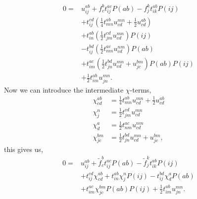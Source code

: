 \documentclass[
    a4paper, aps, twocolumn, floatfix, superscriptaddress,
    nofootinbib]{revtex4-1}
\newcommand{\1}{\mathds{1}}
\begin{document}
    \begin{equation}
        \begin{aligned}
        0 =& u^{ab}_{ij} + f^b_c t^{ac}_{ij}P(ab) - f^k_jt^{ab}_{ik}P(ij) \\
          &+ t^{cd}_{ij} \left(\frac{1}{4}t^{ab}_{mn} u^{mn}_{cd} + \frac{1}{2} u^{ab}_{cd} \right) \\
          &+  t^{ab}_{in} \left(\frac{1}{2} t^{cd}_{jm} u^{mn}_{cd}\right) P(ij) \\
          &- t^{bd}_{ij} \left(\frac{1}{2}t^{ac}_{nm}  u^{nm}_{cd}\right) P(ab) \\
          &+ t^{ac}_{im}\left(\frac{1}{2} t^{bd}_{jn} u^{mn}_{cd} + u^{bm}_{jc} \right)P(ab) P(ij) \\
          &+ \frac{1}{2}t^{ab}_{im} u^{mn}_{jn}.
        \end{aligned}
    \end{equation}
    Now we can introduce the intermediate $\chi$-terms,
    \begin{align}
        \chi^{ab}_{cd} &= \frac{1}{4}t^{ab}_{mn} u^{mn}_{cd} + \frac{1}{2}u^{ab}_{cd} \\
        \chi^n_j &= \frac{1}{2}t^{cd}_{jm} u^{mn}_{cd} \\
        \chi^a_d &= \frac{1}{2} t^{ac}_{nm} u^{nm}_{cd} \\
        \chi^{bm}_{jc} &= \frac{1}{2}t^{bd}_{jn}u^{mn}_{cd} + u^{bm}_{jc},
    \end{align}
    this gives us,
    \begin{equation}
        \begin{aligned}
            0 =& u^{ab}_{ij} + \tilde{f}^b_c t^{ac}_{ij}P(ab) - \tilde{f}^k_jt^{ab}_{ik}P(ij) \\
              &+ t^{cd}_{ij}\chi^{ab}_{cd} + t^{ab}_{in}\chi^n_jP(ij)
               - t^{bd}_{ij}\chi^a_dP(ab) \\
              &+ t^{ac}_{im}\chi^{bm}_{jc}P(ab)P(ij) + \frac{1}{2}t^{ab}_{im}u^{mn}_{jn}.
        \end{aligned}
    \end{equation}


\clearpage
%
%
%
%


\end{document}
